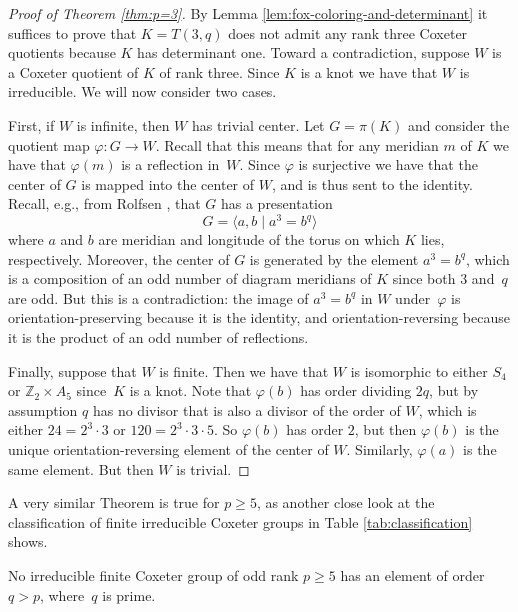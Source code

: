 \documentclass[main.tex]{subfiles}
\begin{document}
\begin{proof}[Proof of Theorem \ref{thm:p=3}]
By Lemma \ref{lem:fox-coloring-and-determinant} it suffices to prove that $K = T(3, q)$ does not admit any rank three Coxeter quotients because $K$ has determinant one. Toward a contradiction, suppose $W$ is a Coxeter quotient of $K$ of rank three. Since $K$ is a knot we have that $W$ is irreducible. We will now consider two cases.

First, if $W$ is infinite, then $W$ has trivial center. Let $G = \pi(K)$ and consider the quotient map $\varphi: G \rightarrow W$. Recall that this means that for any meridian $m$ of $K$ we have that $\varphi(m)$ is a reflection in~$W$. Since $\varphi$ is surjective we have that the center of $G$ is mapped into the center of $W$, and is thus sent to the identity. Recall, e.g., from Rolfsen \cite{rolfsen2003}, that $G$ has a presentation
$$G = \langle a, b \; | \; a^3 = b^q \rangle$$
where $a$ and $b$ are meridian and longitude of the torus on which $K$ lies, respectively. Moreover, the center of $G$ is generated by the element $a^3 = b^q$, which is a composition of an odd number of diagram meridians of $K$ since both $3$ and~$q$ are odd. But this is a contradiction: the image of $a^3 = b^q$ in $W$ under~$\varphi$ is orientation-preserving because it is the identity, and orientation-reversing because it is the product of an odd number of reflections.

Finally, suppose that $W$ is finite. Then we have that $W$ is isomorphic to either $S_4$ or $\mathbb{Z}_2 \times A_5$ since~$K$ is a knot. Note that $\varphi(b)$ has order dividing $2q$, but by assumption $q$ has no divisor that is also a divisor of the order of $W$, which is either $24 = 2^3 \cdot 3$ or $120 = 2^3 \cdot 3 \cdot 5$. So $\varphi(b)$ has order $2$, but then $\varphi(b)$ is the unique orientation-reversing element of the center of $W$. Similarly, $\varphi(a)$ is the same element. But then $W$ is trivial.
\end{proof}

A very similar Theorem is true for $p \geq 5$, as another close look at the classification of finite irreducible Coxeter groups in Table \ref{tab:classification} shows.

\begin{lemma}\label{lem:$p>=5$}
No irreducible finite Coxeter group of odd rank $p \geq 5$ has an element of order $q > p$, where~$q$ is prime.
\end{lemma}
\end{document}

